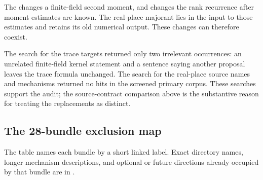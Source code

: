 The 
changes a finite-field second moment, and
changes the rank recurrence after moment estimates are known. The real-place
majorant lies in the input to those estimates and retains its old numerical output.
These changes can therefore coexist.

The search for the trace targets returned only two irrelevant occurrences: an
unrelated finite-field kernel statement and a sentence saying another proposal
leaves the trace formula unchanged. The search for the real-place source names
and mechanisms returned no hits in the screened primary corpus. These searches
support the audit; the source-contract comparison above is the substantive
reason for treating the replacements as distinct.

\subsection{The 28-bundle exclusion map}

The table names each bundle by a short linked label. Exact directory names,
longer mechanism descriptions, and optional or future directions already occupied
by that bundle are in .

